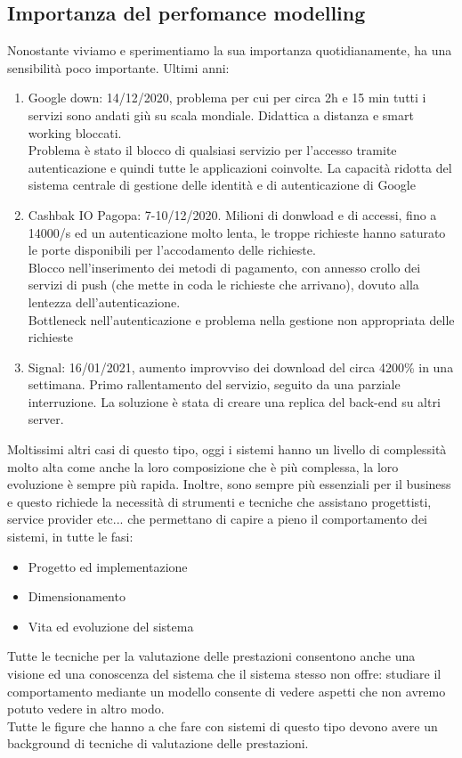 \documentclass{article}
\begin{document}
\subsection{Importanza del perfomance modelling}
Nonostante viviamo e sperimentiamo la sua importanza quotidianamente, ha una sensibilità poco importante. Ultimi anni:
\begin{enumerate}
\item Google down: 14/12/2020, problema per cui per circa 2h e 15 min tutti i servizi sono andati giù su scala mondiale. Didattica a distanza e smart working bloccati.\\ Problema è stato il blocco di qualsiasi servizio per l'accesso tramite autenticazione e quindi tutte le applicazioni coinvolte. La capacità ridotta del sistema centrale di gestione delle identità e di autenticazione di Google
\item Cashbak IO Pagopa: 7-10/12/2020. Milioni di donwload e di accessi, fino a 14000/s ed un autenticazione molto lenta, le troppe richieste hanno saturato le porte disponibili per l'accodamento delle richieste.\\ Blocco nell'inserimento dei metodi di pagamento, con annesso crollo dei servizi di push (che mette in coda le richieste che arrivano), dovuto alla lentezza dell'autenticazione.\\ Bottleneck nell'autenticazione e problema nella gestione non appropriata delle richieste
\item Signal: 16/01/2021, aumento improvviso dei download del circa 4200\% in una settimana. Primo rallentamento del servizio, seguito da una parziale interruzione. La soluzione è stata di creare una replica del back-end su altri server.
\end{enumerate}
Moltissimi altri casi di questo tipo, oggi i sistemi hanno un livello di complessità molto alta come anche la loro composizione che è più complessa, la loro evoluzione è sempre più rapida. Inoltre, sono sempre più essenziali per il business e questo richiede la necessità di strumenti e tecniche che assistano progettisti, service provider etc... che permettano di capire a pieno il comportamento dei sistemi, in tutte le fasi:
\begin{itemize}
\item Progetto ed implementazione
\item Dimensionamento
\item Vita ed evoluzione del sistema 
\end{itemize}
Tutte le tecniche per la valutazione delle prestazioni consentono anche una visione ed una conoscenza del sistema che il sistema stesso non offre: studiare il comportamento mediante un modello consente di vedere aspetti che non avremo potuto vedere in altro modo.\\ Tutte le figure che hanno a che fare con sistemi di questo tipo devono avere un background di tecniche di valutazione delle prestazioni.
\end{document}
